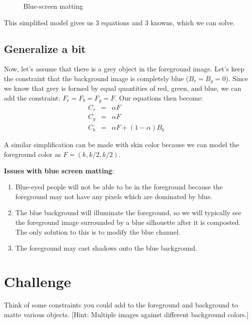 \documentclass{article}
\begin{document}
\begin{figure}[t]
 \centering
 \label{superman}
 \caption{Blue-screen matting}
\end{figure}

This simplified model gives us 3 equations and 3 knowns, which we can solve.

\subsection{Generalize a bit}
Now, let's assume that there is a grey object in the foreground image. Let's keep the constraint that the background image is completely blue ($B_r = B_g = 0$). Since we know that grey is formed by equal quantities of red, green, and blue, we can add the constraint: $F_r = F_b = F_g = F$. Our equations then become:
\begin{eqnarray*}
C_r &=& \alpha F  \\
C_g &=& \alpha F  \\
C_b &=& \alpha F + (1-\alpha) B_b 
\end{eqnarray*}

A similar simplification can be made with skin color because we can model the foreground color as $F = \left(k, k/2, k/2\right)$.

\textbf{Issues with blue screen matting}: 
\begin{enumerate}
    \item Blue-eyed people will not be able to be in the foreground because the foreground may not have any pixels which are dominated by blue.
    \item The blue background will illuminate the foreground, so we will typically see the foreground image surrounded by a blue silhouette after it is composted. The only solution to this is to modify the blue channel.
    \item The foreground may cast shadows onto the blue background.
\end{enumerate}

\section{Challenge}
Think of some constraints you could add to the foreground and background to matte various objects. [Hint: Multiple images against different background colors.]
\end{document}
